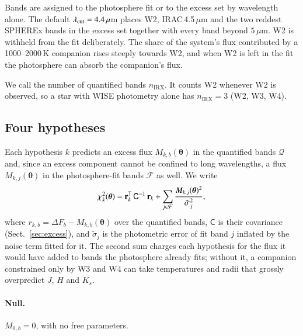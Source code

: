 \documentclass{aa}
\newcommand{\nirx}{n_{\mathrm{IRX}}}
\begin{document}
Bands are assigned to the photosphere fit or to the excess set by wavelength
alone. The default $\lambda_{\rm cut} = 4.4\,\mu$m places W2, IRAC\,4.5\,$\mu$m and
the two reddest SPHEREx bands in the excess set together with every band beyond
$5\,\mu$m. W2 is withheld from the fit deliberately. The share of the
system's flux contributed by a 1000--2000\,K companion rises steeply towards W2,
and when W2 is left in the fit the photosphere can absorb the companion's flux.

We call the number of quantified bands $\nirx$. It counts W2 whenever W2 is
observed, so a star with WISE photometry alone has $\nirx = 3$ (W2, W3, W4).

\subsection{Four hypotheses}
\label{sec:hyp}

Each hypothesis $k$ predicts an excess flux $M_{k,b}(\boldsymbol\theta)$ in the
quantified bands $\mathcal{Q}$ and, since an excess component cannot be confined
to long wavelengths, a flux $M_{k,j}(\boldsymbol\theta)$ in the photosphere-fit
bands $\mathcal{F}$ as well. We write
\begin{equation}
  \chi^2_k(\boldsymbol\theta) =
    \mathbf{r}_k^{\sf T}\,\mathsf{C}^{-1}\,\mathbf{r}_k
  + \sum_{j\in\mathcal{F}}
      \frac{M_{k,j}(\boldsymbol\theta)^2}{\tilde\sigma_j^2} ,
  \label{eq:chi2}
\end{equation}
where $r_{k,b} = \Delta F_b - M_{k,b}(\boldsymbol\theta)$ over the quantified
bands, $\mathsf{C}$ is their covariance (Sect.~\ref{sec:excess}), and
$\tilde\sigma_j$ is the photometric error of fit band $j$ inflated by the
noise term fitted for it. The second sum charges each hypothesis for the flux it
would have added to bands the photosphere already fits; without it, a companion
constrained only by W3 and W4 can take temperatures and radii that grossly
overpredict $J$, $H$ and $K_s$.

\paragraph{Null.} $M_{0,b} = 0$, with no free parameters.
\end{document}
